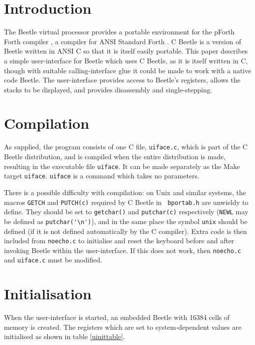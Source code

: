 %
%
%
%


\section{Introduction}

The Beetle virtual processor \cite{beetledis} provides a portable environment
for the pForth Forth compiler \cite{beetledis}, a compiler for ANSI Standard
Forth \cite{ANSIforth}. C Beetle \cite{beetledis} is a version of Beetle
written in ANSI C so that it is itself easily portable. This paper describes
a simple user-interface for Beetle which uses C Beetle, as it is itself
written in C, though with suitable calling-interface glue it could be made to
work with a native code Beetle. The user-interface provides access to
Beetle's registers, allows the stacks to be displayed, and provides
disassembly and single-stepping.


\section{Compilation}

As supplied, the program consists of one C file, {\tt uiface.c}, which is
part of the C Beetle distribution, and is compiled when the entire
distribution is made, resulting in the executable file {\tt uiface}. It can
be made separately as the Make target {\tt uiface}. {\tt uiface} is a command
which takes no parameters.

There is a possible difficulty with compilation: on Unix and similar systems,
the macros {\tt GETCH} and {\tt PUTCH(c)} required by C Beetle in {\tt
bportab.h} are unwieldy to define. They should be set to {\tt getchar()} and
{\tt putchar(c)} respectively ({\tt NEWL} may be defined as
\verb$putchar('\n')$), and in the same place the symbol {\tt unix} should be
defined (if it is not defined automatically by the C compiler). Extra code is
then included from {\tt noecho.c} to initialise and reset the keyboard before
and after invoking Beetle within the user-interface. If this does not work,
then {\tt noecho.c} and {\tt uiface.c} must be modified.


\section{Initialisation}
\label{uifaceinit}

When the user-interface is started, an embedded Beetle with 16384 cells of
memory is created. The registers which are set to system-dependent values are
initialised as shown in table \ref{uinittable}.

